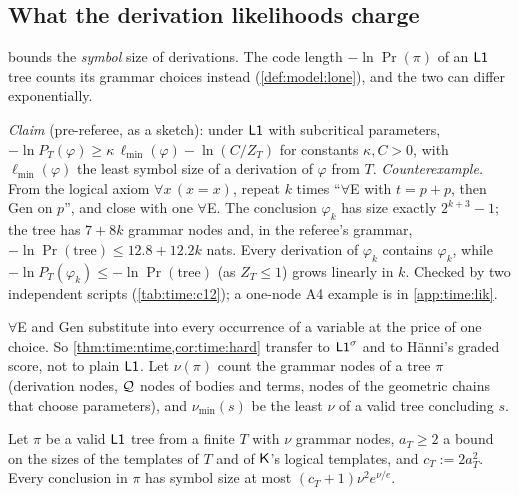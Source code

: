\subsection{What the derivation likelihoods charge}\label{sec:time:lik}

 bounds the \emph{symbol} size of derivations. The code length $-\ln\Pr(\pi)$ of an $\mathord{\mathsf{L1}}$ tree counts its grammar choices instead (\cref{def:model:lone}), and the two can differ exponentially.

\begin{remark}\label{prop:time:lonesize}
\emph{Claim} (pre-referee, as a sketch): under $\mathord{\mathsf{L1}}$ with subcritical parameters, $-\ln P_T(\varphi)\ge\kappa\,\ell_{\min}(\varphi)-\ln(C/Z_T)$ for constants $\kappa,C>0$, with $\ell_{\min}(\varphi)$ the least symbol size of a derivation of $\varphi$ from $T$.
\emph{Counterexample.} From the logical axiom $\forall x\,(x=x)$, repeat $k$ times ``$\forall$E with $t=p+p$, then Gen on $p$'', and close with one $\forall$E. The conclusion $\varphi_k$ has size exactly $2^{k+3}-1$; the tree has $7+8k$ grammar nodes and, in the referee's grammar, $-\ln\Pr(\text{tree})\le12.8+12.2k$ nats. Every derivation of $\varphi_k$ contains $\varphi_k$, while $-\ln P_T(\varphi_k)\le-\ln\Pr(\text{tree})$ (as $Z_T\le1$) grows linearly in $k$. Checked by two independent scripts (\cref{tab:time:c12}); a one-node A4 example is in \cref{app:time:lik}.
\end{remark}

$\forall$E and Gen substitute into every occurrence of a variable at the price of one choice. So \cref{thm:time:ntime,cor:time:hard} transfer to $\mathord{\mathsf{L1}}^{\sigma}$ and to H\"anni's graded score, not to plain $\mathord{\mathsf{L1}}$. Let $\nu(\pi)$ count the grammar nodes of a tree $\pi$ (derivation nodes, $\mathcal{Q}$ nodes of bodies and terms, nodes of the geometric chains that choose parameters), and $\nu_{\min}(s)$ be the least $\nu$ of a valid tree concluding $s$.

\begin{lemma}\label{lem:time:symexp}
Let $\pi$ be a valid $\mathord{\mathsf{L1}}$ tree from a finite $T$ with $\nu$ grammar nodes, $a_T\ge2$ a bound on the sizes of the templates of $T$ and of $\mathsf{K}$'s logical templates, and $c_T:=2a_T^2$. Every conclusion in $\pi$ has symbol size at most $(c_T+1)\nu^2e^{\nu/e}$.
\end{lemma}

